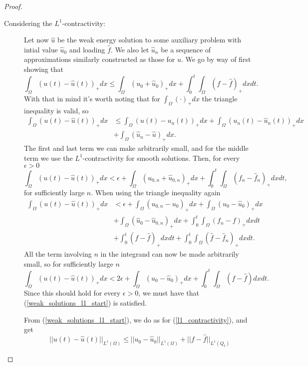 \documentclass[11pt, a4paper]{article}
\begin{document}
\begin{proof}
\begin{description}
	
	\item[Considering the $L^1$-contractivity:] Let now $\hat{u}$ be the weak energy solution to some auxiliary problem with intial value $\hat{u}_0$ and loading $\hat{f}$. We also let $\hat{u}_n$ be a sequence of approximations similarly constructed as those for $u$. We go by way of first showing that
	\begin{equation}
	\label{weak_solutions_l1_start}
	\int_\Omega(u(t)-\hat{u}(t))_+dx \leq \int_\Omega (u_0 + \hat{u}_0)_+dx + \int_0^t \int_\Omega (f- \hat{f})_+ dxdt. 
	\end{equation}
	With that in mind it's worth noting that for $\int_\Omega (\cdot)_+dx$ the triangle inequality is valid, so
	\begin{align*}
	\int_\Omega (u(t) - \hat{u}(t))_+dx &\leq \int_\Omega(u(t) - u_n(t))_+dx + \int_\Omega (u_n(t) - \hat{u}_n(t))_+dx \\
	&+ \int_\Omega(\hat{u}_n - \hat{u})_+dx.
	\end{align*}
	The first and last term we can make arbitrarily small, and for the middle term we use the $L^1$-contractivity for smooth solutions. Then, for every $\epsilon > 0$
	\begin{equation*}
	\int_\Omega (u(t) - \hat{u}(t))_+dx < \epsilon + \int_\Omega(u_{0,n} + \hat{u}_{0,n})_+ dx + \int_0^t \int_\Omega (f_n - \hat{f}_n)_+dxdt,
	\end{equation*}
	for sufficiently large $n$. When using the triangle inequality again
	\begin{align*}
	\int_\Omega (u(t) - \hat{u}(t))_+dx &< \epsilon + \int_\Omega(u_{0,n} - u_0)_+dx + \int_\Omega(u_0 - \hat{u}_0)_+dx \\
	&+ \int_\Omega (\hat{u}_0 - \hat{u}_{0,n})_+dx + \int_0^t \int_\Omega(f_n - f)_+dxdt\\
	&+ \int_0^t(f-\hat{f})_+dxdt + \int_0^t\int_\Omega (\hat{f}-\hat{f}_n)_+ dxdt.
	\end{align*}	
	All the term involving $n$ in the integrand can now be made arbitrarily small, so for sufficiently large $n$
	\begin{equation*}
	\int_\Omega (u(t) - \hat{u}(t))_+dx < 2\epsilon +\int_\Omega(u_0 - \hat{u}_0)_+dx + \int_0^t \int_\Omega (f-\hat{f})dxdt.
	\end{equation*}					
	Since this should hold for every $\epsilon >0 $, we must have that (\ref{weak_solutions_l1_start}) is satisfied.
	
	From (\ref{weak_solutions_l1_start}), we do as for (\ref{l1_contractivity}), and get
	\begin{equation*}
	||u(t) - \hat{u}(t)||_{L^1(\Omega)} \leq ||u_0 - \hat{u}_0||_{L^1(\Omega)} + ||f-\hat{f}||_{L^1(Q_t)}
	\end{equation*}
\end{description}


\end{proof}
\end{document}
